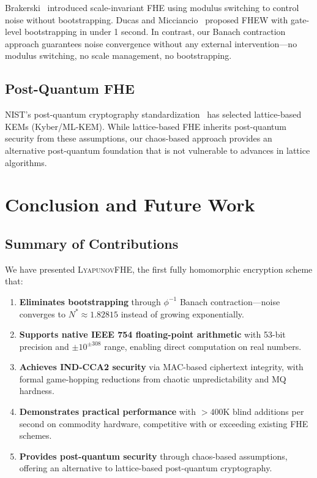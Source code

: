 \documentclass[11pt,a4paper]{article}
\begin{document}
Brakerski~\cite{brakerski2012} introduced scale-invariant FHE using modulus switching to control noise without bootstrapping. Ducas and Micciancio~\cite{ducas2015} proposed FHEW with gate-level bootstrapping in under 1 second. In contrast, our Banach contraction approach guarantees noise convergence without any external intervention—no modulus switching, no scale management, no bootstrapping.

\subsection{Post-Quantum FHE}

NIST's post-quantum cryptography standardization~\cite{nist203} has selected lattice-based KEMs (Kyber/ML-KEM). While lattice-based FHE inherits post-quantum security from these assumptions, our chaos-based approach provides an alternative post-quantum foundation that is not vulnerable to advances in lattice algorithms.

\newpage

\section{Conclusion and Future Work}
\label{sec:conclusion}

\subsection{Summary of Contributions}

We have presented \textsc{LyapunovFHE}, the first fully homomorphic encryption scheme that:

\begin{enumerate}[leftmargin=*,itemsep=2pt]
    \item \textbf{Eliminates bootstrapping} through $\phi^{-1}$ Banach contraction—noise converges to $N^* \approx 1.82815$ instead of growing exponentially.
    \item \textbf{Supports native IEEE 754 floating-point arithmetic} with 53-bit precision and $\pm 10^{\pm 308}$ range, enabling direct computation on real numbers.
    \item \textbf{Achieves IND-CCA2 security} via MAC-based ciphertext integrity, with formal game-hopping reductions from chaotic unpredictability and MQ hardness.
    \item \textbf{Demonstrates practical performance} with $>400$K blind additions per second on commodity hardware, competitive with or exceeding existing FHE schemes.
    \item \textbf{Provides post-quantum security} through chaos-based assumptions, offering an alternative to lattice-based post-quantum cryptography.
\end{enumerate}
\end{document}
